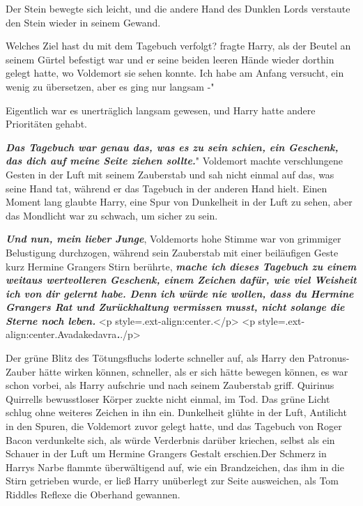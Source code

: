 Der Stein bewegte sich leicht, und die andere Hand des Dunklen Lords verstaute
den Stein wieder in seinem Gewand.

\glqq Welches Ziel hast du mit dem Tagebuch verfolgt?\grqq{} fragte Harry, als
der Beutel an seinem Gürtel befestigt war und er seine beiden leeren Hände
wieder dorthin gelegt hatte, wo Voldemort sie sehen konnte. \glqq Ich habe am
Anfang versucht, ein wenig zu übersetzen, aber es ging nur langsam -"

Eigentlich war es unerträglich langsam gewesen, und Harry hatte andere
Prioritäten gehabt.

\glqq \textbf{\emph{Das Tagebuch war genau das, was es zu sein schien, ein
Geschenk, das dich auf meine Seite ziehen sollte.}}" Voldemort machte
verschlungene Gesten in der Luft mit seinem Zauberstab und sah nicht einmal auf
das, was seine Hand tat, während er das Tagebuch in der anderen Hand hielt.
Einen Moment lang glaubte Harry, eine Spur von Dunkelheit in der Luft zu sehen,
aber das Mondlicht war zu schwach, um sicher zu sein.

\glqq \textbf{\emph{Und nun, mein lieber Junge}}\grqq{}, Voldemorts hohe Stimme
war von grimmiger Belustigung durchzogen, während sein Zauberstab mit einer
beiläufigen Geste kurz Hermine Grangers Stirn berührte, \glqq
\textbf{\emph{mache ich dieses Tagebuch zu einem weitaus wertvolleren Geschenk,
einem Zeichen dafür, wie viel Weisheit ich von dir gelernt habe. Denn ich würde
nie wollen, dass du Hermine Grangers Rat und Zurückhaltung vermissen musst,
nicht solange die Sterne noch leben.}} <p
style=\grqq{}.ext-align:center\grqq{}.\textbf{}</p> <p
style=\grqq{}.ext-align:center\grqq{}.Avadakedavra\textbf{\emph{.}}\grqq{}./p>

Der grüne Blitz des Tötungsfluchs loderte schneller auf, als Harry den
Patronus-Zauber hätte wirken können, schneller, als er sich hätte bewegen
können, es war schon vorbei, als Harry aufschrie und nach seinem Zauberstab
griff. Quirinus Quirrells bewusstloser Körper zuckte nicht einmal, im Tod. Das
grüne Licht schlug ohne weiteres Zeichen in ihn ein. Dunkelheit glühte in der
Luft, Antilicht in den Spuren, die Voldemort zuvor gelegt hatte, und das
Tagebuch von Roger Bacon verdunkelte sich, als würde Verderbnis darüber
kriechen, selbst als ein Schauer in der Luft um Hermine Grangers Gestalt
erschien.Der Schmerz in Harrys Narbe flammte überwältigend auf, wie ein
Brandzeichen, das ihm in die Stirn getrieben wurde, er ließ Harry unüberlegt zur
Seite ausweichen, als Tom Riddles Reflexe die Oberhand gewannen.

